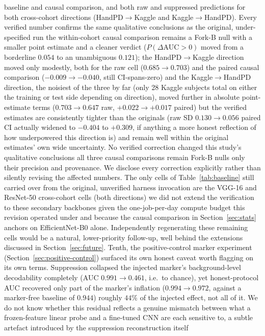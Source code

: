 \documentclass[3p,final,10pt]{elsarticle}
\begin{document}
baseline and causal comparison, and both raw and suppressed predictions
for both cross-cohort directions (HandPD$\to$Kaggle and Kaggle$\to$HandPD).
Every verified number confirms the same qualitative conclusions as the
original, under-specified run the within-cohort causal comparison remains
a Fork-B null with a smaller point estimate and a cleaner verdict
($P(\Delta\text{AUC}>0)$ moved from a borderline $0.054$ to an unambiguous
$0.121$); the HandPD$\to$Kaggle direction moved only modestly, both for
the raw cell ($0.685\to0.703$) and the paired causal comparison
($-0.009\to-0.040$, still CI-spans-zero) and the Kaggle$\to$HandPD
direction, the noisiest of the three by far (only 28 Kaggle subjects total
on either the training or test side depending on direction), moved further
in absolute point-estimate terms ($0.703\to0.647$ raw,
$+0.022\to+0.017$ paired) but the verified estimates are consistently
tighter than the originals (raw SD $0.130\to0.056$ paired CI actually
widened to $-0.404$ to $+0.309$, if anything a more honest reflection of
how underpowered this direction is) and remain well within the original
estimates' own wide uncertainty. No verified correction changed this
study's qualitative conclusions all three causal comparisons remain
Fork-B nulls only their precision and provenance. We disclose every
correction explicitly rather than silently revising the affected numbers.
The only cells of Table~\ref{tab:baseline} still carried over from the
original, unverified harness invocation are the VGG-16 and ResNet-50
cross-cohort cells (both directions) we did not extend the verification to
these secondary backbones given the one-job-per-day compute budget this
revision operated under and because the causal comparison in
Section~\ref{sec:stats} anchors on EfficientNet-B0 alone. Independently
regenerating these remaining cells would be a natural, lower-priority
follow-up, well behind the extensions discussed in
Section~\ref{sec:future}. Tenth, the positive-control marker experiment
(Section~\ref{sec:positive-control}) surfaced its own honest caveat worth
flagging on its own terms. Suppression collapsed the injected marker's
background-level decodability completely (AUC $0.991\to0.461$, i.e.\ to
chance), yet honest-protocol AUC recovered only part of the marker's
inflation ($0.994\to0.972$, against a marker-free baseline of $0.944$)
roughly $44\%$ of the injected effect, not all of it. We do not know
whether this residual reflects a genuine mismatch between what a
frozen-feature linear probe and a fine-tuned CNN are each sensitive to, a
subtle artefact introduced by the suppression reconstruction itself
\end{document}
